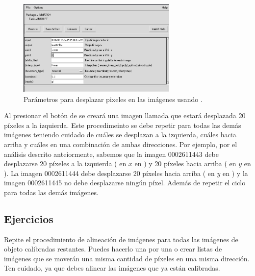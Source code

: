 \begin{figure}[htb]
  \centering
				\includegraphics[width=0.7\textwidth]{figures/pyraf-imshift-42.png}
				\caption{Parámetros para desplazar pixeles en las imágenes usando .}
				\label{fig:pyraf-imshift} 
\end{figure}

Al presionar el botón de  se creará una imagen llamada  que estará desplazada 20 píxeles a la izquierda. Este procedimeinto se debe repetir para todas las demás imágenes teniendo cuidado de cuáles se desplazan a la izquierda, cuáles hacia arriba y cuáles en una combinación de ambas direcciones. Por ejemplo, por el análisis descrito anteiormente, sabemos que la imagen 0002611443 debe desplazarse 20 píxeles a la izquierda ( en $ x $ en ) y 20 píxeles hacia arriba ( en $ y $ en ). La imagen 0002611444 debe desplazarse 20 píxeles hacia arriba ( en $ y $ en ) y la imagen 0002611445 no debe desplazarse ningún píxel. Además de repetir el ciclo para todas las demás imágenes. 

\subsection{Ejercicios}
Repite el procedimiento de alineación de imágenes para todas las imágenes de objeto calibradas restantes. Puedes hacerlo una por una o crear listas de imágenes que se moverán una misma cantidad de píxeles en una misma dirección. Ten cuidado, ya que debes alinear las imágenes que ya están calibradas. 



